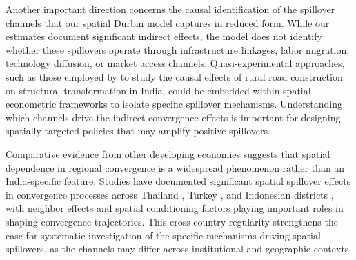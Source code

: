 \documentclass[
  a4paper, 
  twoside,
  review
]{article}
\begin{document}
Another important direction concerns the causal identification of the
spillover channels that our spatial Durbin model captures in reduced
form. While our estimates document significant indirect effects, the
model does not identify whether these spillovers operate through
infrastructure linkages, labor migration, technology diffusion, or
market access channels. Quasi-experimental approaches, such as those
employed by \citet{asher_novosad_rural_roads} to study the causal
effects of rural road construction on structural transformation in
India, could be embedded within spatial econometric frameworks to
isolate specific spillover mechanisms. Understanding which channels
drive the indirect convergence effects is important for designing
spatially targeted policies that may amplify positive spillovers.

Comparative evidence from other developing economies suggests that
spatial dependence in regional convergence is a widespread phenomenon
rather than an India-specific feature. Studies have documented
significant spatial spillover effects in convergence processes across
Thailand \citep{tipayalai_mendez_thailand}, Turkey
\citep{ursavas_mendez_turkey}, and Indonesian districts
\citep{miranti_mendez_indonesia}, with neighbor effects and spatial
conditioning factors playing important roles in shaping convergence
trajectories. This cross-country regularity strengthens the case for
systematic investigation of the specific mechanisms driving spatial
spillovers, as the channels may differ across institutional and
geographic contexts.
\end{document}
